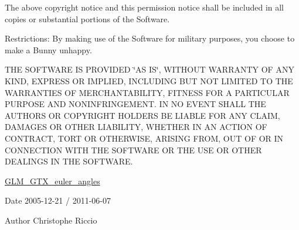 The above copyright notice and this permission notice shall be included in all copies or substantial portions of the Software.

Restrictions\-: By making use of the Software for military purposes, you choose to make a Bunny unhappy.

T\-H\-E S\-O\-F\-T\-W\-A\-R\-E I\-S P\-R\-O\-V\-I\-D\-E\-D \char`\"{}\-A\-S I\-S\char`\"{}, W\-I\-T\-H\-O\-U\-T W\-A\-R\-R\-A\-N\-T\-Y O\-F A\-N\-Y K\-I\-N\-D, E\-X\-P\-R\-E\-S\-S O\-R I\-M\-P\-L\-I\-E\-D, I\-N\-C\-L\-U\-D\-I\-N\-G B\-U\-T N\-O\-T L\-I\-M\-I\-T\-E\-D T\-O T\-H\-E W\-A\-R\-R\-A\-N\-T\-I\-E\-S O\-F M\-E\-R\-C\-H\-A\-N\-T\-A\-B\-I\-L\-I\-T\-Y, F\-I\-T\-N\-E\-S\-S F\-O\-R A P\-A\-R\-T\-I\-C\-U\-L\-A\-R P\-U\-R\-P\-O\-S\-E A\-N\-D N\-O\-N\-I\-N\-F\-R\-I\-N\-G\-E\-M\-E\-N\-T. I\-N N\-O E\-V\-E\-N\-T S\-H\-A\-L\-L T\-H\-E A\-U\-T\-H\-O\-R\-S O\-R C\-O\-P\-Y\-R\-I\-G\-H\-T H\-O\-L\-D\-E\-R\-S B\-E L\-I\-A\-B\-L\-E F\-O\-R A\-N\-Y C\-L\-A\-I\-M, D\-A\-M\-A\-G\-E\-S O\-R O\-T\-H\-E\-R L\-I\-A\-B\-I\-L\-I\-T\-Y, W\-H\-E\-T\-H\-E\-R I\-N A\-N A\-C\-T\-I\-O\-N O\-F C\-O\-N\-T\-R\-A\-C\-T, T\-O\-R\-T O\-R O\-T\-H\-E\-R\-W\-I\-S\-E, A\-R\-I\-S\-I\-N\-G F\-R\-O\-M, O\-U\-T O\-F O\-R I\-N C\-O\-N\-N\-E\-C\-T\-I\-O\-N W\-I\-T\-H T\-H\-E S\-O\-F\-T\-W\-A\-R\-E O\-R T\-H\-E U\-S\-E O\-R O\-T\-H\-E\-R D\-E\-A\-L\-I\-N\-G\-S I\-N T\-H\-E S\-O\-F\-T\-W\-A\-R\-E.

\hyperlink{group__gtx__euler__angles}{G\-L\-M\-\_\-\-G\-T\-X\-\_\-euler\-\_\-angles}

\begin{DoxyDate}{Date}
2005-\/12-\/21 / 2011-\/06-\/07 
\end{DoxyDate}
\begin{DoxyAuthor}{Author}
Christophe Riccio 
\end{DoxyAuthor}
